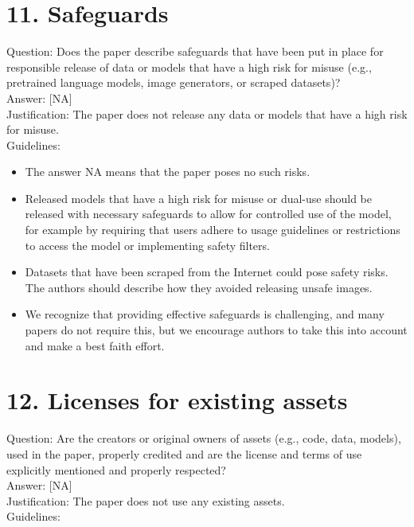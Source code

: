 \documentclass[10pt]{article}
\begin{document}
\section*{11. Safeguards}
Question: Does the paper describe safeguards that have been put in place for responsible release of data or models that have a high risk for misuse (e.g., pretrained language models, image generators, or scraped datasets)?\\[0pt]
Answer: [NA]\\
Justification: The paper does not release any data or models that have a high risk for misuse.\\
Guidelines:

\begin{itemize}
  \item The answer NA means that the paper poses no such risks.
  \item Released models that have a high risk for misuse or dual-use should be released with necessary safeguards to allow for controlled use of the model, for example by requiring that users adhere to usage guidelines or restrictions to access the model or implementing safety filters.
  \item Datasets that have been scraped from the Internet could pose safety risks. The authors should describe how they avoided releasing unsafe images.
  \item We recognize that providing effective safeguards is challenging, and many papers do not require this, but we encourage authors to take this into account and make a best faith effort.
\end{itemize}

\section*{12. Licenses for existing assets}
Question: Are the creators or original owners of assets (e.g., code, data, models), used in the paper, properly credited and are the license and terms of use explicitly mentioned and properly respected?\\[0pt]
Answer: [NA]\\
Justification: The paper does not use any existing assets.\\
Guidelines:
\end{document}
